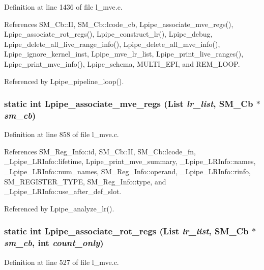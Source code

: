 Definition at line 1436 of file l\_\-mve.c.

References SM\_\-Cb::II, SM\_\-Cb::lcode\_\-cb, Lpipe\_\-associate\_\-mve\_\-regs(), Lpipe\_\-associate\_\-rot\_\-regs(), Lpipe\_\-construct\_\-lr(), Lpipe\_\-debug, Lpipe\_\-delete\_\-all\_\-live\_\-range\_\-info(), Lpipe\_\-delete\_\-all\_\-mve\_\-info(), Lpipe\_\-ignore\_\-kernel\_\-inst, Lpipe\_\-mve\_\-lr\_\-list, Lpipe\_\-print\_\-live\_\-ranges(), Lpipe\_\-print\_\-mve\_\-info(), Lpipe\_\-schema, MULTI\_\-EPI, and REM\_\-LOOP.

Referenced by Lpipe\_\-pipeline\_\-loop().
\subsubsection{\setlength{\rightskip}{0pt plus 5cm}static int Lpipe\_\-associate\_\-mve\_\-regs (List {\em lr\_\-list}, \bf{SM\_\-Cb} $\ast$ {\em sm\_\-cb})\hspace{0.3cm}{\tt  [static]}}\label{l__mve_8c_cd8521ecc279eb04026b93e86c2d4d90}




Definition at line 858 of file l\_\-mve.c.

References SM\_\-Reg\_\-Info::id, SM\_\-Cb::II, SM\_\-Cb::lcode\_\-fn, \_\-Lpipe\_\-LRInfo::lifetime, Lpipe\_\-print\_\-mve\_\-summary, \_\-Lpipe\_\-LRInfo::names, \_\-Lpipe\_\-LRInfo::num\_\-names, SM\_\-Reg\_\-Info::operand, \_\-Lpipe\_\-LRInfo::rinfo, SM\_\-REGISTER\_\-TYPE, SM\_\-Reg\_\-Info::type, and \_\-Lpipe\_\-LRInfo::use\_\-after\_\-def\_\-slot.

Referenced by Lpipe\_\-analyze\_\-lr().
\subsubsection{\setlength{\rightskip}{0pt plus 5cm}static int Lpipe\_\-associate\_\-rot\_\-regs (List {\em lr\_\-list}, \bf{SM\_\-Cb} $\ast$ {\em sm\_\-cb}, int {\em count\_\-only})\hspace{0.3cm}{\tt  [static]}}\label{l__mve_8c_cd205735f2bb6b94e9d3fb0b544e5bc0}




Definition at line 527 of file l\_\-mve.c.

